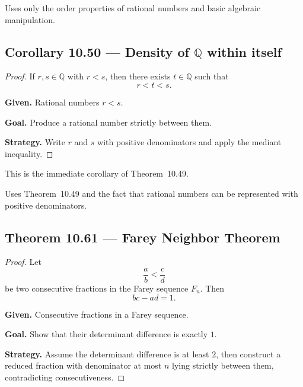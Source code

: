 \begin{remark*}[Dependencies]
Uses only the order properties of rational numbers and basic algebraic
manipulation.
\end{remark*}


\subsection*{Corollary 10.50 — Density of $\mathbb{Q}$ within itself}
\label{prf:grep-density-q-within-q}

\begin{proof}
\Claim If $r,s \in \mathbb{Q}$ with $r<s$, then there exists $t \in \mathbb{Q}$ such that
\[
r < t < s.
\]

\textbf{Given.} Rational numbers $r<s$.

\textbf{Goal.} Produce a rational number strictly between them.

\textbf{Strategy.} Write $r$ and $s$ with positive denominators and apply the mediant inequality.


\end{proof}

\begin{remark*}
This is the immediate corollary of Theorem~10.49.
\end{remark*}

\begin{remark*}[Dependencies]
Uses Theorem~10.49 and the fact that rational numbers can be represented with
positive denominators.
\end{remark*}


\subsection*{Theorem 10.61 — Farey Neighbor Theorem}
\label{prf:grep-farey-neighbor-theorem}

\begin{proof}
\Claim Let
\[
\frac{a}{b} < \frac{c}{d}
\]
be two consecutive fractions in the Farey sequence $F_n$. Then
\[
bc-ad = 1.
\]

\textbf{Given.} Consecutive fractions in a Farey sequence.

\textbf{Goal.} Show that their determinant difference is exactly $1$.

\textbf{Strategy.} Assume the determinant difference is at least $2$, then construct a reduced fraction with denominator at most $n$ lying strictly between them, contradicting consecutiveness.


\end{proof}

